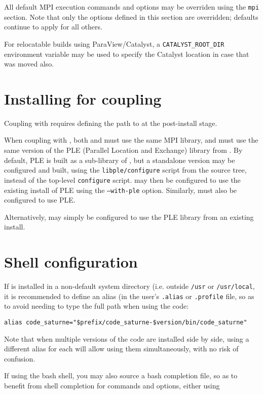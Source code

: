 \documentclass[a4paper,10pt,twoside]{csshortdoc}
\begin{document}
All default MPI execution commands and options may be overriden using the
\texttt{mpi} section. Note that only the options defined in this section
are overridden; defaults continue to apply for all others.

For relocatable builds using ParaView/Catalyst, a \texttt{CATALYST\_ROOT\_DIR}
environment variable may be used to specify the Catalyst location
in case that was moved also.

\section{Installing for \syrthes coupling\label{sec:syrthes}}

Coupling with  requires defining the path to 
at the post-install stage.

When coupling with , both \CS and \syrthes must
use the same MPI library, and must use the same version of the
PLE (Parallel Location and Exchange) library from \CS. By default, PLE
is built as a sub-library of \CS, but a standalone version may be
configured and built, using the \texttt{libple/configure} script
from the \CS source tree, instead of the top-level \texttt{configure}
script. \CS may then be configured to use the existing install of PLE
using the \texttt{--with-ple} option. Similarly, \syrthes must also
be configured to use PLE.

Alternatively,  may simply be configured to use the PLE
library from an existing \CS install.

\section{Shell configuration}

If \CS is installed in a non-default system directory (i.e. outside
\texttt{/usr} or \texttt{/usr/local}, it is recommended to define
an alias (in the user's \texttt{.alias} or \texttt{.profile} file, so as to
avoid needing to type the full path when using the code:

\texttt{alias code\_saturne="\$prefix/code\_saturne-\$version/bin/code\_saturne"}

Note that when multiple versions of the code are installed side by side, using
a different alias for each will allow using them simultaneously, with no risk
of confusion.

If using the bash shell, you may also source a bash completion file,
so as to benefit from shell completion for \CS commands
and options, either using
\end{document}
